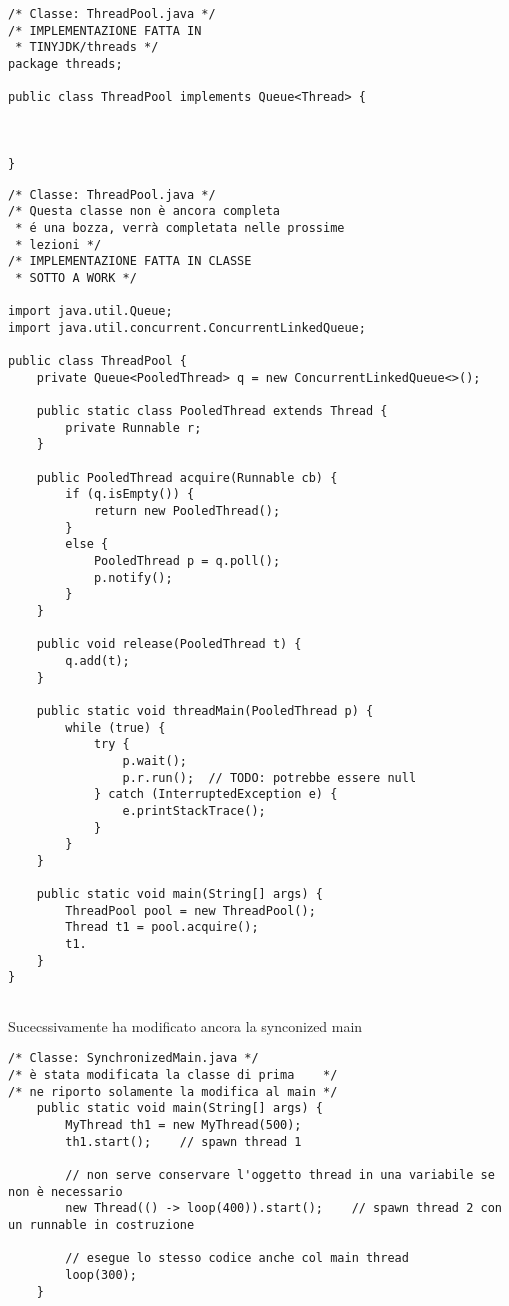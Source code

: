 \begin{lstlisting}[basicstyle=\small,]
/* Classe: ThreadPool.java */
/* IMPLEMENTAZIONE FATTA IN 
 * TINYJDK/threads */
package threads;

public class ThreadPool implements Queue<Thread> {



}

\end{lstlisting}

\begin{lstlisting}[basicstyle=\small,]
/* Classe: ThreadPool.java */
/* Questa classe non è ancora completa 
 * é una bozza, verrà completata nelle prossime
 * lezioni */
/* IMPLEMENTAZIONE FATTA IN CLASSE 
 * SOTTO A WORK */
 
import java.util.Queue;
import java.util.concurrent.ConcurrentLinkedQueue;

public class ThreadPool {
    private Queue<PooledThread> q = new ConcurrentLinkedQueue<>();

    public static class PooledThread extends Thread {
        private Runnable r;
    }

    public PooledThread acquire(Runnable cb) {
        if (q.isEmpty()) {
            return new PooledThread();
        }
        else {
            PooledThread p = q.poll();
            p.notify();
        }
    }

    public void release(PooledThread t) {
        q.add(t);
    }

    public static void threadMain(PooledThread p) {
        while (true) {
            try {
                p.wait();
                p.r.run();  // TODO: potrebbe essere null
            } catch (InterruptedException e) {
                e.printStackTrace();
            }
        }
    }

    public static void main(String[] args) {
        ThreadPool pool = new ThreadPool();
        Thread t1 = pool.acquire();
        t1.
    }
}


\end{lstlisting}




\noindent Sucecssivamente ha modificato ancora la synconized main

\begin{lstlisting}[basicstyle=\small,]
/* Classe: SynchronizedMain.java */
/* è stata modificata la classe di prima    */
/* ne riporto solamente la modifica al main */
    public static void main(String[] args) {
        MyThread th1 = new MyThread(500);
        th1.start();    // spawn thread 1

        // non serve conservare l'oggetto thread in una variabile se non è necessario
        new Thread(() -> loop(400)).start();    // spawn thread 2 con un runnable in costruzione

        // esegue lo stesso codice anche col main thread
        loop(300);  
    }

\end{lstlisting}










